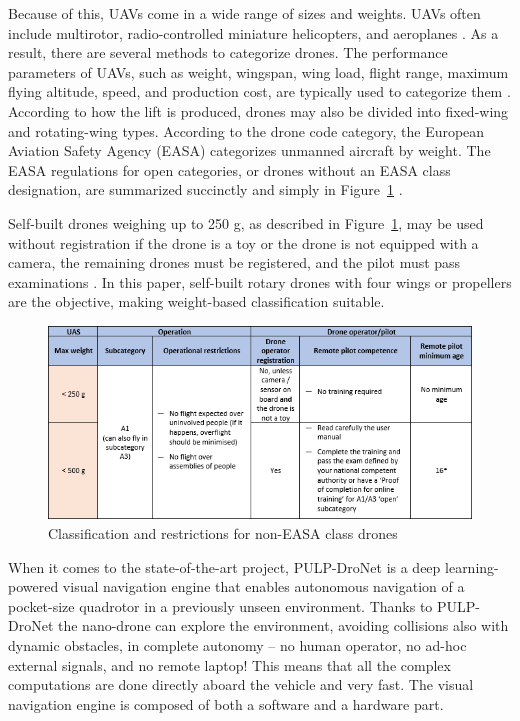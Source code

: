 \documentclass[titlepage,a4paper,11pt]{article}
\begin{document}
Because of this, UAVs come in a wide range of sizes and weights.
UAVs often include multirotor, radio-controlled miniature helicopters, and aeroplanes \cite{Ann2012}.
As a result, there are several methods to categorize drones. The performance parameters of UAVs, such as weight, wingspan, wing load, flight range, maximum flying altitude, speed, and production cost, are typically used to categorize them \cite{Hassanalian2017}.
According to how the lift is produced, drones may also be divided into fixed-wing and rotating-wing types.
According to the drone code category, the European Aviation Safety Agency (EASA) categorizes unmanned aircraft by weight.
The EASA regulations for open categories, or drones without an EASA class designation, are summarized succinctly and simply in Figure~\ref{fig:Table} \cite{Euasa}.

Self-built drones weighing up to 250 g, as described in Figure~\ref{fig:Table}, may be used without registration if the drone is a toy or the drone is not equipped with a camera, the remaining drones must be registered, and the pilot must pass examinations \cite{Euasa}. In this paper, self-built rotary drones with four wings or propellers are the objective, making weight-based classification suitable.

\begin{figure}[H]
    \centering
    \includegraphics[scale = 0.9]{classification.PNG}
    \caption{Classification and restrictions for non-EASA class drones \cite{Euasa}}
    \label{fig:Table}
\end{figure}


When it comes to the state-of-the-art project, PULP-DroNet is a deep learning-powered visual navigation engine that enables autonomous navigation of a pocket-size quadrotor in a previously unseen environment. Thanks to PULP-DroNet the nano-drone can explore the environment, avoiding collisions also with dynamic obstacles, in complete autonomy -- no human operator, no ad-hoc external signals, and no remote laptop! This means that all the complex computations are done directly aboard the vehicle and very fast. The visual navigation engine is composed of both a software and a hardware part. \cite{Niculescu2021}
\end{document}
